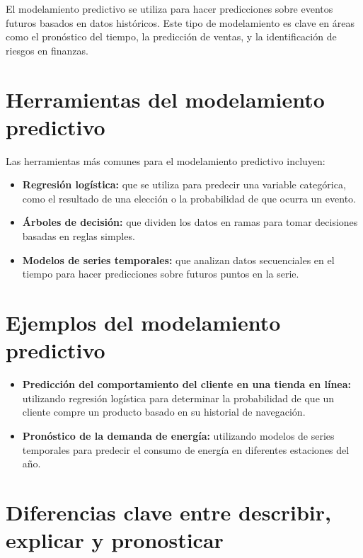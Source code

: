 \documentclass[
  letterpaper,
  DIV=11,
  numbers=noendperiod]{scrreprt}
\providecommand{\tightlist}{%
  \setlength{\itemsep}{0pt}\setlength{\parskip}{0pt}}\usepackage{longtable,booktabs,array}
\begin{document}
El modelamiento predictivo se utiliza para hacer predicciones sobre
eventos futuros basados en datos históricos. Este tipo de modelamiento
es clave en áreas como el pronóstico del tiempo, la predicción de
ventas, y la identificación de riesgos en finanzas.

\section{Herramientas del modelamiento
predictivo}\label{herramientas-del-modelamiento-predictivo}

Las herramientas más comunes para el modelamiento predictivo incluyen:

\begin{itemize}
\tightlist
\item
  \textbf{Regresión logística:} que se utiliza para predecir una
  variable categórica, como el resultado de una elección o la
  probabilidad de que ocurra un evento.
\item
  \textbf{Árboles de decisión:} que dividen los datos en ramas para
  tomar decisiones basadas en reglas simples.
\item
  \textbf{Modelos de series temporales:} que analizan datos secuenciales
  en el tiempo para hacer predicciones sobre futuros puntos en la serie.
\end{itemize}

\section{Ejemplos del modelamiento
predictivo}\label{ejemplos-del-modelamiento-predictivo}

\begin{itemize}
\tightlist
\item
  \textbf{Predicción del comportamiento del cliente en una tienda en
  línea:} utilizando regresión logística para determinar la probabilidad
  de que un cliente compre un producto basado en su historial de
  navegación.
\item
  \textbf{Pronóstico de la demanda de energía:} utilizando modelos de
  series temporales para predecir el consumo de energía en diferentes
  estaciones del año.
\end{itemize}

\section{Diferencias clave entre describir, explicar y
pronosticar}\label{diferencias-clave-entre-describir-explicar-y-pronosticar}
\end{document}
